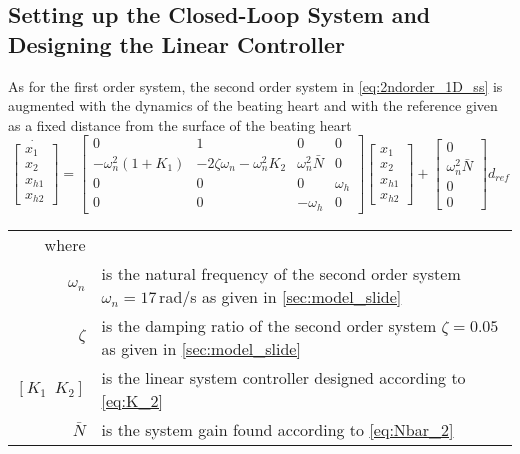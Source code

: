 \subsection{Setting up the Closed-Loop System and Designing the Linear Controller}
As for the first order system, the second order system in \autoref{eq:2ndorder_1D_ss} is augmented with the dynamics of the beating heart and with the reference given as a fixed distance from the surface of the beating heart
\begin{equation}
\dot{\begin{bmatrix}
x_1\\x_2\\x_{h1}\\x_{h2}
\end{bmatrix}} = \begin{bmatrix}
0 & 1 & 0 & 0\\
-\omega_n^2(1+K_1)  & -2\zeta \omega_n-\omega_n^2 K_2  & \omega_n^2\bar{N} & 0\\
0 & 0 & 0 & \omega_h \\
0 & 0 & -\omega_h & 0
\end{bmatrix}\begin{bmatrix}
x_1\\x_2\\x_{h1}\\x_{h2}
\end{bmatrix} + \begin{bmatrix}
0\\\omega_n^2\bar{N} \\ 0 \\ 0
\end{bmatrix}d_{ref}
\end{equation}
\begin{tabular}{rl}
where &\\
$\omega_n$ & is the natural frequency of the second order system $\omega_n=17$\,rad/s as given in \autoref{sec:model_slide}\\
$\zeta$ & is the damping ratio of the second order system $\zeta=0.05$ as given in \autoref{sec:model_slide}\\
$[K_1\,\,\,K_2]$ & is the linear system controller designed according to \autoref{eq:K_2}\\
$\bar{N}$ & is the system gain found according to \autoref{eq:Nbar_2}
\end{tabular}\\


